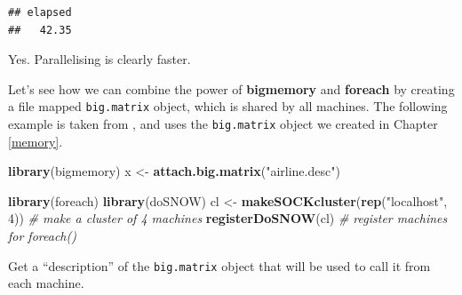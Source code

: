 \documentclass[]{book}
\newenvironment{Shaded}{\begin{snugshade}}{\end{snugshade}}
\newcommand{\KeywordTok}[1]{\textcolor[rgb]{0.13,0.29,0.53}{\textbf{#1}}}
\newcommand{\DataTypeTok}[1]{\textcolor[rgb]{0.13,0.29,0.53}{#1}}
\newcommand{\DecValTok}[1]{\textcolor[rgb]{0.00,0.00,0.81}{#1}}
\newcommand{\StringTok}[1]{\textcolor[rgb]{0.31,0.60,0.02}{#1}}
\newcommand{\CommentTok}[1]{\textcolor[rgb]{0.56,0.35,0.01}{\textit{#1}}}
\newcommand{\OtherTok}[1]{\textcolor[rgb]{0.56,0.35,0.01}{#1}}
\newcommand{\OperatorTok}[1]{\textcolor[rgb]{0.81,0.36,0.00}{\textbf{#1}}}
\newcommand{\NormalTok}[1]{#1}
\theoremstyle{definition}
\theoremstyle{definition}
\theoremstyle{definition}
\theoremstyle{remark}
\begin{document}
\begin{Shaded}
\end{Shaded}

\begin{verbatim}
## elapsed 
##   42.35
\end{verbatim}

Yes. Parallelising is clearly faster.

Let's see how we can combine the power of \textbf{bigmemory} and
\textbf{foreach} by creating a file mapped \texttt{big.matrix} object,
which is shared by all machines. The following example is taken from
\citet{kane2013scalable}, and uses the \texttt{big.matrix} object we
created in Chapter \ref{memory}.

\begin{Shaded}
\begin{Highlighting}[]
\KeywordTok{library}\NormalTok{(bigmemory)}
\NormalTok{x <-}\StringTok{ }\KeywordTok{attach.big.matrix}\NormalTok{(}\StringTok{"airline.desc"}\NormalTok{)}

\KeywordTok{library}\NormalTok{(foreach)}
\KeywordTok{library}\NormalTok{(doSNOW)}
\NormalTok{cl <-}\StringTok{ }\KeywordTok{makeSOCKcluster}\NormalTok{(}\KeywordTok{rep}\NormalTok{(}\StringTok{"localhost"}\NormalTok{, }\DecValTok{4}\NormalTok{)) }\CommentTok{# make a cluster of 4 machines}
\KeywordTok{registerDoSNOW}\NormalTok{(cl) }\CommentTok{# register machines for foreach()}
\end{Highlighting}
\end{Shaded}

Get a ``description'' of the \texttt{big.matrix} object that will be
used to call it from each machine.
\end{document}
